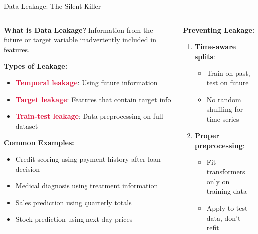 \documentclass[aspectratio=169,11pt]{beamer}
\begin{document}
\begin{frame}{Data Leakage: The Silent Killer}
\begin{columns}
\begin{column}{0.5\textwidth}
\textbf{What is Data Leakage?}
Information from the future or target variable inadvertently included in features.

\vspace{0.3cm}
\textbf{Types of Leakage:}

\begin{itemize}
\item \textcolor{crimson}{\textbf{Temporal leakage}}: Using future information
\item \textcolor{crimson}{\textbf{Target leakage}}: Features that contain target info
\item \textcolor{crimson}{\textbf{Train-test leakage}}: Data preprocessing on full dataset
\end{itemize}

\vspace{0.3cm}
\textbf{Common Examples:}
\begin{itemize}
\item Credit scoring using payment history after loan decision
\item Medical diagnosis using treatment information
\item Sales prediction using quarterly totals
\item Stock prediction using next-day prices
\end{itemize}
\end{column}
\begin{column}{0.5\textwidth}
\textbf{Preventing Leakage:}

\begin{enumerate}
\item \textbf{Time-aware splits}:
   \begin{itemize}
   \item Train on past, test on future
   \item No random shuffling for time series
   \end{itemize}

\item \textbf{Proper preprocessing}:
   \begin{itemize}
   \item Fit transformers only on training data
   \item Apply to test data, don't refit
   \end{itemize}


\end{enumerate}
\end{column}
\end{columns}
\end{frame}
\end{document}

